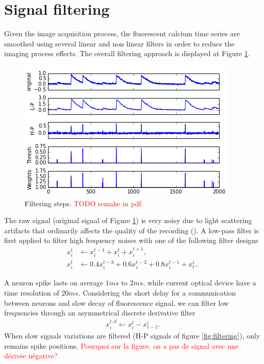 \documentclass[wcp]{jmlr}
\begin{document}
\section{Signal filtering} \label{sec:filter}

Given the image acquisition process, the fluorescent calcium time series
are smoothed using several linear and non linear filters in
order to reduce the imaging process effects. The overall filtering approach
is displayed at Figure \ref{fig:fitlering}.


\begin{figure}[bth]
\includegraphics[width=\linewidth]{images/fig_filtering_recut.png}
\caption{Filtering steps. \textcolor{red}{TODO remake in pdf}}
\label{fig:fitlering}
\end{figure}

The raw signal (original signal of Figure \ref{fig:fitlering}) is very noisy
due to light scattering artifacts that ordinarily affects the quality of the
recording (\cite{lichtman2011big}). A low-pass filter is first applied to
filter high frequency noises with one of the following filter designs
\begin{align}
x^t_i &\leftarrow x^{t-1}_i + x^{t}_i + x^{t+1}_i \label{eq:symetric-median}, \\
x^t_i &\leftarrow 0.4 x^{t-3}_i + 0.6 x^{t-2}_i + 0.8 x^{t-1}_i + x_{t}^i.
\label{eq:weighted-asymetric-median}.
\end{align}

A neuron spike lasts on average $1ms$ to $2ms$, while current optical
device have a time resolution of $20ms$. Considering the short delay for a
communication between neurons and slow decay of fluorescence signal, we
can filter low frequencies through an asymmetrical discrete derivative filter
\begin{align}
x^{t,d}_{i} \leftarrow x^{t}_i - x_{t-1}^i.
\end{align}
When slow signals variations are filtered (H-P signals of figure
\ref{fig:filtering}), only remains spike positions.
\textcolor{red}{Pourquoi sur la figure, on a pas de signal avec une dérivée
                négative?}
\end{document}
